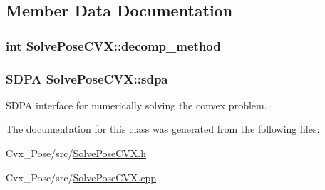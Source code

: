 \subsection{\-Member \-Data \-Documentation}
\hypertarget{classSolvePoseCVX_a6d4be163f9b06fc013c99bbacceece14}{
\subsubsection[{decomp\-\_\-method}]{\setlength{\rightskip}{0pt plus 5cm}int {\bf \-Solve\-Pose\-C\-V\-X\-::decomp\-\_\-method}}}\label{classSolvePoseCVX_a6d4be163f9b06fc013c99bbacceece14}
\hypertarget{classSolvePoseCVX_af0c222b2ce7361ff8a54eee918ea1c65}{
\subsubsection[{sdpa}]{\setlength{\rightskip}{0pt plus 5cm}\-S\-D\-P\-A {\bf \-Solve\-Pose\-C\-V\-X\-::sdpa}}}\label{classSolvePoseCVX_af0c222b2ce7361ff8a54eee918ea1c65}


\-S\-D\-P\-A interface for numerically solving the convex problem. 



\-The documentation for this class was generated from the following files\-:\begin{DoxyCompactItemize}
\item 
\-Cvx\-\_\-\-Pose/src/\hyperlink{SolvePoseCVX_8h}{\-Solve\-Pose\-C\-V\-X.\-h}\item 
\-Cvx\-\_\-\-Pose/src/\hyperlink{SolvePoseCVX_8cpp}{\-Solve\-Pose\-C\-V\-X.\-cpp}\end{DoxyCompactItemize}
